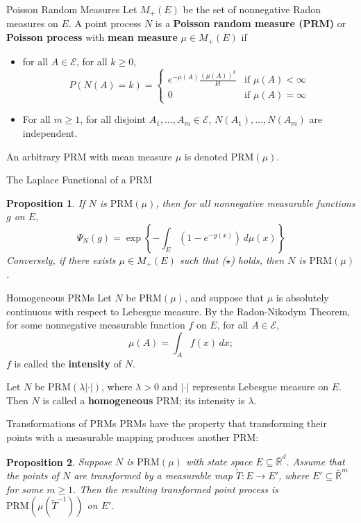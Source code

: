 \documentclass{beamer}
\newcommand{\PRM}{\text{PRM}}
\newtheorem{proposition}{Proposition}
\begin{document}
\begin{frame}{Poisson Random Measures}
    Let $M_+(E)$ be the set of nonnegative Radon measures on $E$. A point process $N$ is a \textbf{Poisson random measure (PRM)} or \textbf{Poisson process} with \textbf{mean measure} $\mu \in M_+(E)$ if
    \begin{itemize}
    \item for all $A \in \mathcal{E}$, for all $k \ge 0$,
    \[
    P(N(A) = k) =
        \begin{cases}
            e^{-\mu(A)}\frac{(\mu(A))^k}{k!} & \text{if $\mu(A) < \infty$} \\
            0 & \text{if $\mu(A) = \infty$}
        \end{cases}
    \]
    \item For all $m \ge 1$, for all disjoint $A_1, \ldots, A_m \in \mathcal{E}$, $N(A_1), \ldots, N(A_m)$ are independent.
    \end{itemize}
    An arbitrary PRM with mean measure $\mu$ is denoted $\PRM(\mu)$.
\end{frame}

\begin{frame}{The Laplace Functional of a PRM}
    \begin{proposition}
        If $N$ is $\PRM(\mu)$, then for all nonnegative measurable functions $g$ on $E$,
        \[
        \Psi_N(g) = \exp\left\{-\int_E \left(1 - e^{-g(x)}\right)\,d\mu(x)\right\} \tag{$\star$}
        \]
        Conversely, if there exists $\mu \in M_+(E)$ such that ($\star$) holds, then $N$ is $\PRM(\mu)$.
    \end{proposition}
\end{frame}

\begin{frame}{Homogeneous PRMs}
    Let $N$ be $\PRM(\mu)$, and suppose that $\mu$ is absolutely continuous with respect to Lebesgue measure. By the Radon-Nikodym Theorem, for some nonnegative measurable function $f$ on $E$, for all $A \in \mathcal{E}$,
    \[
    \mu(A) = \int_A f(x)\,dx;
    \]
    $f$ is called the \textbf{intensity} of $N$.

    \smallskip
    
    Let $N$ be $\PRM(\lambda|\cdot|)$, where $\lambda > 0$ and $|\cdot|$ represents Lebesgue measure on $E$. Then $N$ is called a \textbf{homogeneous} PRM; its intensity is $\lambda$.
\end{frame}

\begin{frame}{Transformations of PRMs}
    PRMs have the property that transforming their points with a measurable mapping produces another PRM:
    \begin{proposition}
        Suppose $N$ is $\PRM(\mu)$ with state space $E \subseteq \bar{\mathbb{R}}^d$. Assume that the points of $N$ are transformed by a measurable map $\tilde{T} : E \to E'$, where $E' \subseteq \bar{\mathbb{R}}^m$ for some $m \ge 1$. Then the resulting transformed point process is $\PRM(\mu(\tilde{T}^{-1}))$ on $E'$.
    \end{proposition}
\end{frame}
\end{document}
